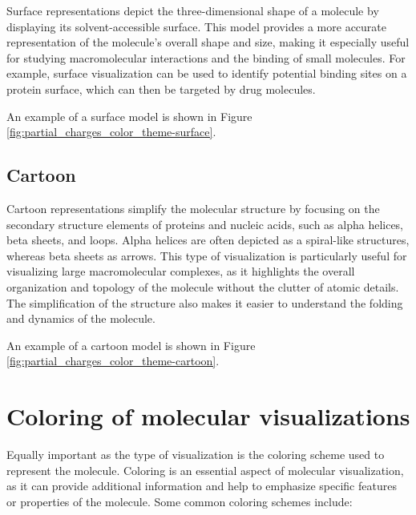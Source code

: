\documentclass[
  digital,     %
  oneside,     %
  nosansbold,  %
  nocolorbold, %
  lof,         %
  lot,         %
]{fithesis4}
\begin{document}
Surface representations depict the three-dimensional shape of a molecule by displaying its solvent-accessible surface.
This model provides a more accurate representation of the molecule's overall shape and size, making it especially useful for studying macromolecular interactions and the binding of small molecules.
For example, surface visualization can be used to identify potential binding sites on a protein surface, which can then be targeted by drug molecules.

An example of a surface model is shown in Figure \ref{fig:partial_charges_color_theme-surface}.

\subsection{Cartoon}
\label{subsection:cartoon}

Cartoon representations simplify the molecular structure by focusing on the secondary structure elements of proteins and nucleic acids, such as alpha helices, beta sheets, and loops. Alpha helices are often depicted as a spiral-like structures, whereas beta sheets as arrows. This type of visualization is particularly useful for visualizing large macromolecular complexes, as it highlights the overall organization and topology of the molecule without the clutter of atomic details. The simplification of the structure also makes it easier to understand the folding and dynamics of the molecule.

An example of a cartoon model is shown in Figure \ref{fig:partial_charges_color_theme-cartoon}.

\section{Coloring of molecular visualizations}
\label{subsection:coloring_of_molecular_visualizations}


Equally important as the type of visualization is the coloring scheme used to represent the molecule. Coloring is an essential aspect of molecular visualization, as it can provide additional information and help to emphasize specific features or properties of the molecule. Some common coloring schemes include:
\end{document}
